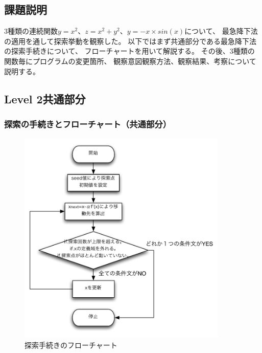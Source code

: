 \subsection{課題説明}
3種類の連続関数$y=x^2$、$z=x^2+y^2$、$y=-x \times sin(x)$について、
最急降下法の適用を通して探索挙動を観察した。
以下ではまず共通部分である最急降下法の探索手続きについて、
フローチャートを用いて解説する。
その後、3種類の関数毎にプログラムの変更箇所、
観察意図観察方法、観察結果、考察について説明する。
\subsection{Level 2共通部分}

\subsubsection{探索の手続きとフローチャート（共通部分）}
\begin{figure}[htbp]
  \begin{center}
    \includegraphics[clip,width=10.0cm]{./figs/tonal1.pdf}
    \caption{探索手続きのフローチャート}
 \end{center}
\end{figure}
\newpage
